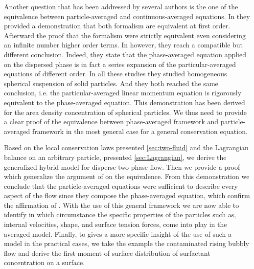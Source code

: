 Another question that has been addressed by several authors \citep{nott2011suspension,zhang1997momentum} is the one of the equivalence between particle-averaged and continuous-averaged equations. 
In \citet[Appendix A]{zhang1997momentum} they provided a demonstration that both formalism are equivalent at first order. 
Afterward \citet[Appendix A]{nott2011suspension} the proof that the formalism were strictly equivalent even considering an infinite number higher order terms. 
In \citet{lhuillier2010multiphase} however, they reach a compatible but different conclusion. 
Indeed, they state that the phase-averaged equation applied on the dispersed phase is in fact a series expansion of the particular-averaged equations of different order. 
In all these studies they studied homogeneous spherical suspension of solid particles. 
And they both reached the same conclusion, i.e. the particular-averaged linear momentum equation is rigorously equivalent to the phase-averaged equation. 
This demonstration has been derived for the area density concentration of spherical particles. 
We thus need to provide a clear proof of the equivalence between phase-averaged framework and particle-averaged framework in the most general case for a general conservation equation. 


Based on the local conservation laws presented \ref{sec:two-fluid} and the Lagrangian balance on an arbitrary particle, presented \ref{sec:Lagrangian}, we derive the generalized hybrid model for disperse two phase flow. 
Then we provide a proof which generalize the argument of  \citet{lhuillier2000bilan} on the equivalence. 
From this demonstration we conclude that the particle-averaged equations were sufficient to describe every aspect of the flow since they compose the phase-averaged equation, which confirm the affirmation of \citet[Appendix A]{zhang1997momentum}. 
With the use of this general framework we are now able to identify in which circumstance the specific properties of the particles such as, internal velocities, shape, and surface tension forces, come into play in the averaged model. 
Finally, to gives a more specific insight of the use of such a model in the practical cases, we take the example the contaminated rising bubbly flow and derive the first moment of surface distribution of surfactant concentration on a surface. 
